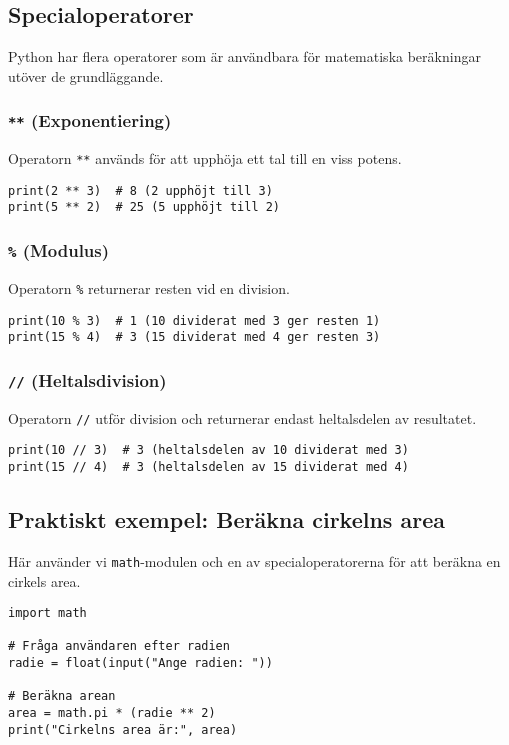 \subsection{Specialoperatorer}
Python har flera operatorer som är användbara för matematiska beräkningar utöver de grundläggande.

\subsubsection{\texttt{**} (Exponentiering)}
Operatorn \texttt{**} används för att upphöja ett tal till en viss potens.
\begin{lstlisting}[title=Exempel på \texttt{**}]
print(2 ** 3)  # 8 (2 upphöjt till 3)
print(5 ** 2)  # 25 (5 upphöjt till 2)
\end{lstlisting}

\subsubsection{\texttt{\%} (Modulus)}
Operatorn \texttt{\%} returnerar resten vid en division.
\begin{lstlisting}[title=Exempel på \texttt{\%}]
print(10 % 3)  # 1 (10 dividerat med 3 ger resten 1)
print(15 % 4)  # 3 (15 dividerat med 4 ger resten 3)
\end{lstlisting}


\subsubsection{\texttt{//} (Heltalsdivision)}
Operatorn \texttt{//} utför division och returnerar endast heltalsdelen av resultatet.
\begin{lstlisting}[title=Exempel på \texttt{//}]
print(10 // 3)  # 3 (heltalsdelen av 10 dividerat med 3)
print(15 // 4)  # 3 (heltalsdelen av 15 dividerat med 4)
\end{lstlisting}


\subsection{Praktiskt exempel: Beräkna cirkelns area}
Här använder vi \texttt{math}-modulen och en av specialoperatorerna för att beräkna en cirkels area.
\begin{lstlisting}[title=Beräkna cirkelns area]
import math

# Fråga användaren efter radien
radie = float(input("Ange radien: "))

# Beräkna arean
area = math.pi * (radie ** 2)
print("Cirkelns area är:", area)
\end{lstlisting}

